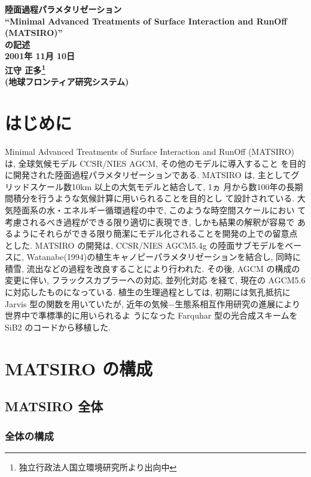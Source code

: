 ﻿

\begin{center}
{\LARGE \bf 
陸面過程パラメタリゼーション\\
``Minimal Advanced Treatments of Surface Interaction and RunOff
(MATSIRO)''\\
の記述
}
\bigskip \\
{\Large \bf
2001年 11月 10日 \medskip\\
江守 正多\footnote{独立行政法人国立環境研究所より出向中}
\\
(地球フロンティア研究システム)
\bigskip \\
}
\end{center}
\section{はじめに}
Minimal Advanced Treatments of Surface Interaction and RunOff
(MATSIRO) は, 全球気候モデル CCSR/NIES AGCM, その他のモデルに導入すること
を目的に開発された陸面過程パラメタリゼーションである. 
MATSIRO は, 主としてグリッドスケール数10km 以上の大気モデルと結合して, 1ヵ
月から数100年の長期間積分を行うような気候計算に用いられることを目的とし
て設計されている. 
大気陸面系の水・エネルギー循環過程の中で, このような時空間スケールにおい
て考慮されるべき過程ができる限り適切に表現でき, しかも結果の解釈が容易で
あるようにそれらができる限り簡潔にモデル化されることを開発の上での留意点
とした. 
MATSIRO の開発は, CCSR/NIES AGCM5.4g の陸面サブモデルをベースに,
Watanabe(1994)の植生キャノピーパラメタリゼーションを結合し, 同時に積雪, 
流出などの過程を改良することにより行われた. 
その後, AGCM の構成の変更に伴い, フラックスカプラーへの対応, 並列化対応
を経て, 現在の AGCM5.6 に対応したものになっている. 
植生の生理過程としては, 初期には気孔抵抗に Jarvis 型の関数を用いていたが,
近年の気候−生態系相互作用研究の進展により世界中で準標準的に用いられるよ
うになった Farquhar 型の光合成スキームを SiB2 のコードから移植した. 

\section{MATSIRO の構成}

\subsection{MATSIRO 全体}

\subsubsection{全体の構成}

